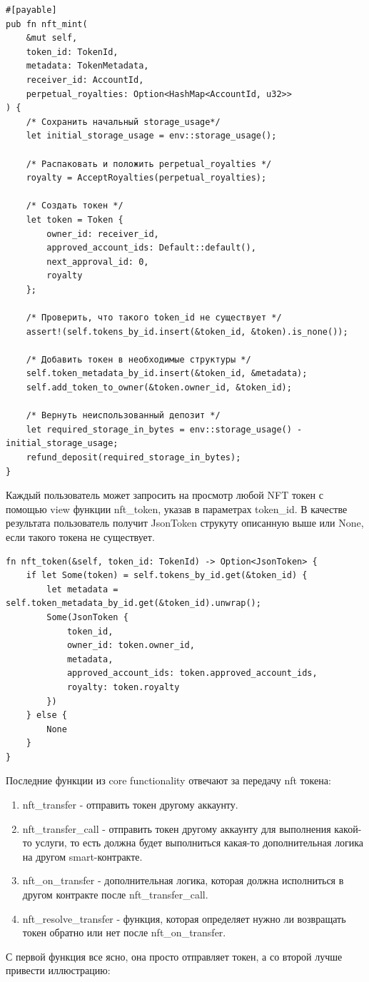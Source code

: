 \begin{verbatim}
#[payable]
pub fn nft_mint(
    &mut self,
    token_id: TokenId,
    metadata: TokenMetadata,
    receiver_id: AccountId,
    perpetual_royalties: Option<HashMap<AccountId, u32>>
) {
    /* Сохранить начальный storage_usage*/
    let initial_storage_usage = env::storage_usage();

    /* Распаковать и положить perpetual_royalties */
    royalty = AcceptRoyalties(perpetual_royalties);

    /* Создать токен */
    let token = Token {
        owner_id: receiver_id,
        approved_account_ids: Default::default(),
        next_approval_id: 0,
        royalty
    };

    /* Проверить, что такого token_id не существует */
    assert!(self.tokens_by_id.insert(&token_id, &token).is_none());

    /* Добавить токен в необходимые структуры */
    self.token_metadata_by_id.insert(&token_id, &metadata);
    self.add_token_to_owner(&token.owner_id, &token_id);

    /* Вернуть неиспользованный депозит */
    let required_storage_in_bytes = env::storage_usage() - initial_storage_usage;
    refund_deposit(required_storage_in_bytes);
}
\end{verbatim}

Каждый пользователь может запросить на просмотр любой NFT токен с помощью view функции nft\_token, указав в параметрах token\_id.
В качестве результата пользователь получит JsonToken струкуту описанную выше или None, если такого токена не существует.

\begin{verbatim}
fn nft_token(&self, token_id: TokenId) -> Option<JsonToken> {
    if let Some(token) = self.tokens_by_id.get(&token_id) {
        let metadata = self.token_metadata_by_id.get(&token_id).unwrap();
        Some(JsonToken {
            token_id,
            owner_id: token.owner_id,
            metadata,
            approved_account_ids: token.approved_account_ids,
            royalty: token.royalty
        })
    } else {
        None
    }
}
\end{verbatim}

Последние функции из core functionality отвечают за передачу nft токена:
\begin{enumerate}
\item nft\_transfer - отправить токен другому аккаунту.
\item nft\_transfer\_call - отправить токен другому аккаунту для выполнения какой-то услуги, то есть должна будет выполниться какая-то дополнительная логика на другом smart-контракте.
\item nft\_on\_transfer - дополнительная логика, которая должна исполниться в другом контракте после nft\_transfer\_call.
\item nft\_resolve\_transfer - функция, которая определяет нужно ли возвращать токен обратно или нет после nft\_on\_transfer.
\end{enumerate}
С первой функция все ясно, она просто отправляет токен, а со второй лучше привести иллюстрацию:

